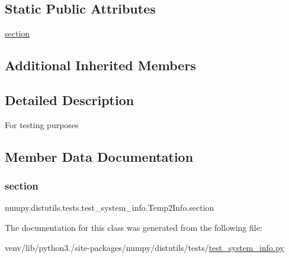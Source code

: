\subsection*{Static Public Attributes}
\begin{DoxyCompactItemize}
\item 
\hyperlink{classnumpy_1_1distutils_1_1tests_1_1test__system__info_1_1Temp2Info_aa461a1b418b180675da877e5ce02a2e3}{section}
\end{DoxyCompactItemize}
\subsection*{Additional Inherited Members}


\subsection{Detailed Description}
\begin{DoxyVerb}For testing purposes\end{DoxyVerb}
 

\subsection{Member Data Documentation}
\mbox{\label{classnumpy_1_1distutils_1_1tests_1_1test__system__info_1_1Temp2Info_aa461a1b418b180675da877e5ce02a2e3}} 
\subsubsection{\texorpdfstring{section}{section}}
{\footnotesize\ttfamily numpy.\+distutils.\+tests.\+test\+\_\+system\+\_\+info.\+Temp2\+Info.\+section\hspace{0.3cm}{\ttfamily [static]}}



The documentation for this class was generated from the following file\+:\begin{DoxyCompactItemize}
\item 
venv/lib/python3./site-\/packages/numpy/distutils/tests/\hyperlink{test__system__info_8py}{test\+\_\+system\+\_\+info.\+py}\end{DoxyCompactItemize}
